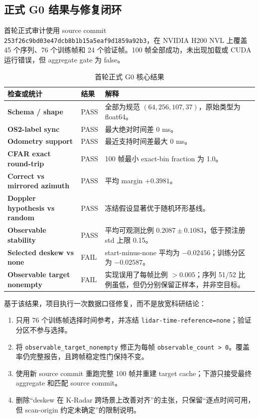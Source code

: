 \documentclass[11pt,a4paper,fontset=none]{ctexart}
\newcommand{\code}[1]{\texttt{#1}}
\begin{document}
\subsection{正式 G0 结果与修复闭环}

首轮正式审计使用 source commit \code{253f26c9bd03e47dcb8b1b15a5eaf9d1859a92b3}，在 NVIDIA H200 NVL 上覆盖 45 个序列、76 个训练帧和 24 个验证帧。100 帧全部成功，未出现加载或 CUDA 运行错误，但 aggregate gate 为 false。

\begin{table}[H]
\centering
\caption{首轮正式 G0 核心结果}
\begin{tabularx}{\textwidth}{>{\bfseries}p{4.4cm} p{2.5cm} X}
\toprule
检查或统计 & 结果 & 解释 \\
\midrule
Schema / shape & PASS & 全部为规范 $(64,256,107,37)$，原始类型为 float64。\\
OS2-label sync & PASS & 最大绝对时间差 0 ms。\\
Odometry support & PASS & 最近支持时间差最大 0 ms。\\
CFAR exact round-trip & PASS & 100 帧最小 exact-bin fraction 为 1.0。\\
Correct vs mirrored azimuth & PASS & 平均 margin $+0.3981$。\\
Doppler hypothesis vs random & PASS & 冻结假设显著优于随机环形基线。\\
Observable stability & PASS & 平均可观测比例 $0.2087\pm0.1083$，低于预注册 std 上限 0.15。\\
Selected deskew vs none & FAIL & start-minus-none 平均为 $-0.02456$；训练分区为 $-0.02587$。\\
Observable target nonempty & FAIL & 实现误用了每帧比例 $>0.005$；序列 51/52 比例虽低，但仍分别保留正样本，并非空目标。\\
\bottomrule
\end{tabularx}
\end{table}

基于该结果，项目执行一次数据口径修复，而不是放宽科研结论：
\begin{enumerate}
  \item 只用 76 个训练帧选择时间参考，并冻结 \code{lidar-time-reference=none}；验证分区不参与选择。
  \item 将 \code{observable\_target\_nonempty} 修正为每帧 \code{observable\_count > 0}。覆盖率仍完整报告，且跨帧稳定性门保持不变。
  \item 使用新 source commit 重跑完整 100 帧并重建 target cache；下游只接受最终 aggregate 和匹配 source commit。
  \item 删除“deskew 在 K-Radar 跨场景上改善对齐”的主张，只保留“逐点时间可用，但 scan-origin 约定未确定”的限制说明。
\end{enumerate}
\end{document}
